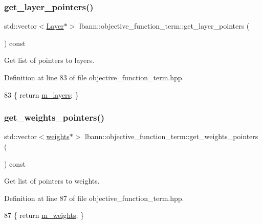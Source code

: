 \subsubsection{\texorpdfstring{get\+\_\+layer\+\_\+pointers()}{get\_layer\_pointers()}}
{\footnotesize\ttfamily std\+::vector$<$\hyperlink{classlbann_1_1Layer}{Layer}$\ast$$>$ lbann\+::objective\+\_\+function\+\_\+term\+::get\+\_\+layer\+\_\+pointers (\begin{DoxyParamCaption}{ }\end{DoxyParamCaption}) const\hspace{0.3cm}{\ttfamily [inline]}}

Get list of pointers to layers. 

Definition at line 83 of file objective\+\_\+function\+\_\+term.\+hpp.


\begin{DoxyCode}
83 \{ \textcolor{keywordflow}{return} \hyperlink{classlbann_1_1objective__function__term_a9269cf0a237eacd1e220ba2739f44334}{m\_layers}; \}
\end{DoxyCode}
\mbox{\label{classlbann_1_1objective__function__term_aea73505aed191bfb9336d9d46a69d586}} 
\subsubsection{\texorpdfstring{get\+\_\+weights\+\_\+pointers()}{get\_weights\_pointers()}}
{\footnotesize\ttfamily std\+::vector$<$\hyperlink{classlbann_1_1weights}{weights}$\ast$$>$ lbann\+::objective\+\_\+function\+\_\+term\+::get\+\_\+weights\+\_\+pointers (\begin{DoxyParamCaption}{ }\end{DoxyParamCaption}) const\hspace{0.3cm}{\ttfamily [inline]}}

Get list of pointers to weights. 

Definition at line 87 of file objective\+\_\+function\+\_\+term.\+hpp.


\begin{DoxyCode}
87 \{ \textcolor{keywordflow}{return} \hyperlink{classlbann_1_1objective__function__term_a1d601c29153ae9cb54c585887608f2bf}{m\_weights}; \}
\end{DoxyCode}
\mbox{\label{classlbann_1_1objective__function__term_aac2240c9925c2b7bf436072a24f3eb30}} 
